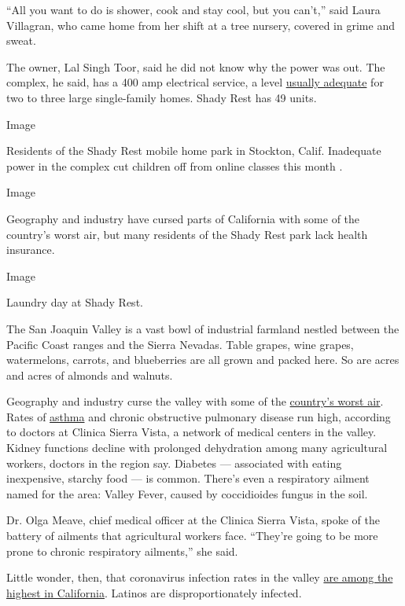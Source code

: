 ``All you want to do is shower, cook and stay cool, but you can't,''
said Laura Villagran, who came home from her shift at a tree nursery,
covered in grime and sweat.

The owner, Lal Singh Toor, said he did not know why the power was out.
The complex, he said, has a 400 amp electrical service, a level
\href{https://homeguides.sfgate.com/check-amp-size-houses-electrical-service-72409.html}{usually
adequate} for two to three large single-family homes. Shady Rest has 49
units.

Image

Residents of the Shady Rest mobile home park in Stockton, Calif.
Inadequate power in the complex cut children off from online classes
this month .

Image

Geography and industry have cursed parts of California with some of the
country's worst air, but many residents of the Shady Rest park lack
health insurance.

Image

Laundry day at Shady Rest.

The San Joaquin Valley is a vast bowl of industrial farmland nestled
between the Pacific Coast ranges and the Sierra Nevadas. Table grapes,
wine grapes, watermelons, carrots, and blueberries are all grown and
packed here. So are acres and acres of almonds and walnuts.

Geography and industry curse the valley with some of the
\href{https://www.eurekalert.org/pub_releases/2020-04/ala-nho041720.php}{country's
worst air}. Rates of
\href{https://www.cdph.ca.gov/Programs/CCDPHP/DEODC/EHIB/CPE/Pages/CaliforniaBreathingCountyAsthmaProfiles.aspx}{asthma}
and chronic obstructive pulmonary disease run high, according to doctors
at Clinica Sierra Vista, a network of medical centers in the valley.
Kidney functions decline with prolonged dehydration among many
agricultural workers, doctors in the region say. Diabetes --- associated
with eating inexpensive, starchy food --- is common. There's even a
respiratory ailment named for the area: Valley Fever, caused by
coccidioides fungus in the soil.

Dr. Olga Meave, chief medical officer at the Clinica Sierra Vista, spoke
of the battery of ailments that agricultural workers face. ``They're
going to be more prone to chronic respiratory ailments,'' she said.

Little wonder, then, that coronavirus infection rates in the valley
\href{https://www.cdph.ca.gov/Programs/CID/DCDC/Pages/COVID-19/COVID19CountyDataTable.aspx}{are
among the highest in California}. Latinos are disproportionately
infected.

